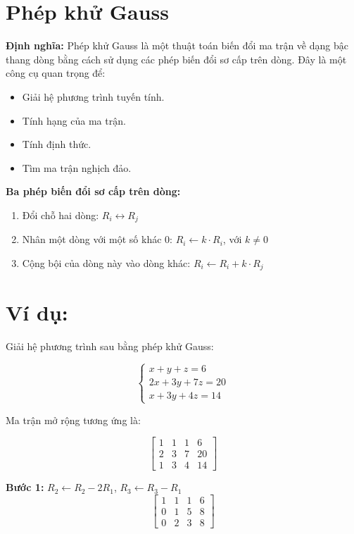 \documentclass[12pt]{article}
\begin{document}
\section*{Phép khử Gauss}

\textbf{Định nghĩa:} Phép khử Gauss là một thuật toán biến đổi ma trận về dạng bậc thang dòng bằng cách sử dụng các phép biến đổi sơ cấp trên dòng. Đây là một công cụ quan trọng để:

\begin{itemize}
    \item Giải hệ phương trình tuyến tính.
    \item Tính hạng của ma trận.
    \item Tính định thức.
    \item Tìm ma trận nghịch đảo.
\end{itemize}

\textbf{Ba phép biến đổi sơ cấp trên dòng:}
\begin{enumerate}
    \item Đổi chỗ hai dòng: \( R_i \leftrightarrow R_j \)
    \item Nhân một dòng với một số khác 0: \( R_i \leftarrow k \cdot R_i \), với \( k \ne 0 \)
    \item Cộng bội của dòng này vào dòng khác: \( R_i \leftarrow R_i + k \cdot R_j \)
\end{enumerate}

\section*{Ví dụ:}
Giải hệ phương trình sau bằng phép khử Gauss:

\[
\begin{cases}
x + y + z = 6 \\
2x + 3y + 7z = 20 \\
x + 3y + 4z = 14
\end{cases}
\]

Ma trận mở rộng tương ứng là:

\[
\begin{bmatrix}
1 & 1 & 1 & 6 \\
2 & 3 & 7 & 20 \\
1 & 3 & 4 & 14
\end{bmatrix}
\]

\textbf{Bước 1:} \( R_2 \leftarrow R_2 - 2R_1 \), \( R_3 \leftarrow R_3 - R_1 \)
\[
\begin{bmatrix}
1 & 1 & 1 & 6 \\
0 & 1 & 5 & 8 \\
0 & 2 & 3 & 8
\end{bmatrix}
\]
\end{document}
